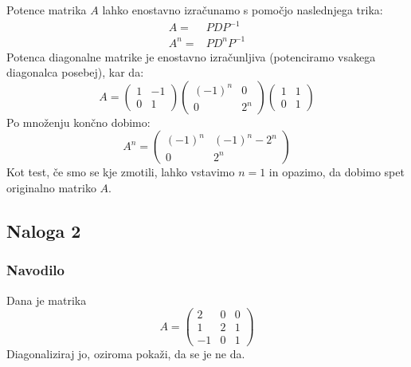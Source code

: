 \documentclass{article}
\begin{document}
Potence matrika $A$ lahko enostavno izračunamo s pomočjo naslednjega trika:
\begin{align*}
A =& P D P^{-1} \\
A^n =& P D^n P^{-1}
\end{align*}
Potenca diagonalne matrike je enostavno izračunljiva (potenciramo vsakega diagonalca posebej), kar da:
\begin{equation*}
A = 
\begin{pmatrix}
1 & -1 \\
0  & 1
\end{pmatrix}
\begin{pmatrix}
(-1)^n & 0 \\
0  & 2^n
\end{pmatrix}
\begin{pmatrix}
1 & 1 \\
0  & 1
\end{pmatrix}
\end{equation*}
Po množenju končno dobimo:
\begin{equation*}
A^n =
\begin{pmatrix}
(-1)^n & (-1)^n - 2^n \\
0  & 2^n
\end{pmatrix} 
\end{equation*}
Kot test, če smo se kje zmotili, lahko vstavimo $n=1$ in opazimo, da dobimo spet originalno matriko $A$.
\subsection*{Naloga 2}
\subsubsection*{Navodilo}
Dana je matrika
\begin{equation*}
A = \begin{pmatrix}
2 & 0 & 0 \\
1  & 2 & 1 \\
-1 & 0 & 1
\end{pmatrix}
\end{equation*}
Diagonaliziraj jo, oziroma pokaži, da se je ne da.
\end{document}
